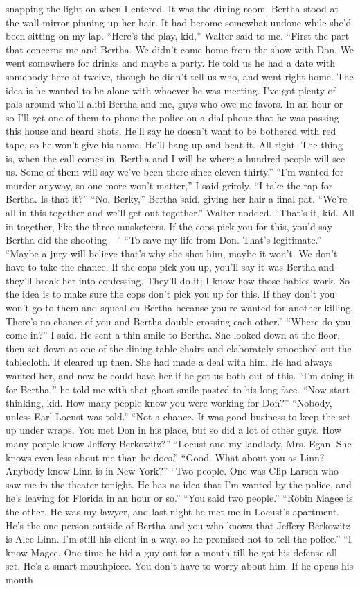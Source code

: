 \documentclass{novel}
\begin{document}
snapping the light on when I entered. It was the dining room. Bertha stood at the wall mirror pinning up her hair. It had become somewhat undone while she’d been sitting on my lap. “Here’s the play, kid,” Walter said to me. “First the part that concerns me and Bertha. We didn’t come home from the show with Don. We went somewhere for drinks and maybe a party. He told us he had a date with somebody here at twelve, though he didn’t tell us who, and went right home. The idea is he wanted to be alone with whoever he was meeting. I’ve got plenty of pals around who’ll alibi Bertha and me, guys who owe me favors. In an hour or so I’ll get one of them to phone the police on a dial phone that he was passing this house and heard shots. He’ll say he doesn’t want to be bothered with red tape, so he won’t give his name. He’ll hang up and beat it. All right. The thing is, when the call comes in, Bertha and I will be where a hundred people will see us. Some of them will say we’ve been there since eleven-thirty.” “I’m wanted for murder anyway, so one more won’t matter,” I said grimly. “I take the rap for Bertha. Is that it?” “No, Berky,” Bertha said, giving her hair a final pat. “We’re all in this together and we’ll get out together.” Walter nodded. “That’s it, kid. All in together, like the three musketeers. If the cops pick you for this, you’d say Bertha did the shooting—” “To save my life from Don. That’s legitimate.” “Maybe a jury will believe that’s why she shot him, maybe it won’t. We don’t have to take the chance. If the cops pick you up, you’ll say it was Bertha and they’ll break her into confessing. They’ll do it; I know how those babies work. So the idea is to make sure the cops don’t pick you up for this. If they don’t you won’t go to them and squeal on Bertha because you’re wanted for another killing. There’s no chance of you and Bertha double crossing each other.” “Where do you come in?” I said. He sent a thin smile to Bertha. She looked down at the floor, then sat down at one of the dining table chairs and elaborately smoothed out the tablecloth. It cleared up then. She had made a deal with him. He had always wanted her, and now he could have her if he got us both out of this. “I’m doing it for Bertha,” he told me with that ghost smile pasted to his long face. “Now start thinking, kid. How many people know you were working for Don?” “Nobody, unless Earl Locust was told.” “Not a chance. It was good business to keep the set-up under wraps. You met Don in his place, but so did a lot of other guys. How many people know Jeffery Berkowitz?” “Locust and my landlady, Mrs. Egan. She knows even less about me than he does.” “Good. What about you as Linn? Anybody know Linn is in New York?” “Two people. One was Clip Larsen who saw me in the theater tonight. He has no idea that I’m wanted by the police, and he’s leaving for Florida in an hour or so.” “You said two people.” “Robin Magee is the other. He was my lawyer, and last night he met me in Locust’s apartment. He’s the one person outside of Bertha and you who knows that Jeffery Berkowitz is Alec Linn. I’m still his client in a way, so he promised not to tell the police.” “I know Magee. One time he hid a guy out for a month till he got his defense all set. He’s a smart mouthpiece. You don’t have to worry about him. If he opens his mouth 
\end{document}
